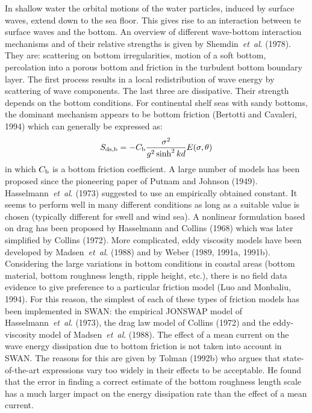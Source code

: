 \documentclass[12pt]{book}
\begin{document}
\noindent
In shallow water the orbital motions of the water particles, induced by surface waves, extend
down to the sea floor. This gives rise to an interaction between te surface waves and the
bottom. An overview of different wave-bottom interaction mechanisms and of their relative
strengths is given by Shemdin~{\it et~al}. (1978). They are: scattering on bottom irregularities,
motion of a soft bottom, percolation into a porous bottom and friction in the turbulent bottom
boundary layer. The first process results in a local redistribution of wave energy by
scattering of wave components. The last three are dissipative. Their strength depends on the
bottom conditions. For continental shelf seas with sandy bottoms, the dominant mechanism appears
to be bottom friction (Bertotti and Cavaleri, 1994) which can generally be expressed as:
\begin{equation}
  S_{\rm ds,b} = -C_{\rm b} \frac{\sigma^2}{g^2 \sinh^2 kd} E (\sigma,\theta)
  \label{eq2-7}
\end{equation}
in which $C_{\rm b}$ is a bottom friction coefficient. A large number of models has been proposed since the
pioneering paper of Putnam and Johnson (1949). Hasselmann~{\it et~al}. (1973) suggested to use an empirically
obtained constant. It seems to perform well in many different conditions as long as a suitable value is chosen
(typically different for swell and wind sea). A nonlinear formulation based on drag has been proposed by Hasselmann
and Collins (1968) which was later simplified by Collins (1972). More complicated, eddy viscosity models have been
developed by Madsen~{\it et~al}. (1988) and by Weber (1989, 1991a, 1991b). Considering the large variations in
bottom conditions in coastal areas (bottom material, bottom roughness length, ripple height, etc.), there
is no field data evidence to give preference to a particular friction model (Luo and Monbaliu, 1994). For
this reason, the simplest of each of these types of friction models has been implemented in SWAN: the
empirical JONSWAP model of Hasselmann~{\it et~al}. (1973), the drag law model of Collins (1972) and the
eddy-viscosity model of Madsen~{\it et~al}. (1988). The effect of a mean current on the wave energy dissipation
due to bottom friction is not taken into account in SWAN. The reasons for this are given by Tolman (1992b)
who argues that state-of-the-art expressions vary too widely in their effects to be acceptable. He found that
the error in finding a correct estimate of the bottom roughness length scale has a much larger impact on
the energy dissipation rate than the effect of a mean current.
\end{document}
